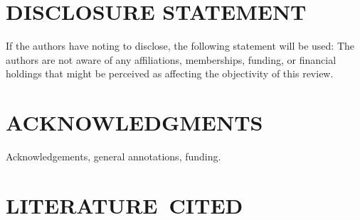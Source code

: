 \documentclass[letterpaper,draft]{ar-1col}
\begin{document}
% 
% 

\section*{DISCLOSURE STATEMENT}
If the authors have noting to disclose, the following statement will be used: The authors are not aware of any affiliations, memberships, funding, or financial holdings that
might be perceived as affecting the objectivity of this review. 

\section*{ACKNOWLEDGMENTS}
Acknowledgements, general annotations, funding.

%
\section*{LITERATURE\ CITED}








 

\end{document}
